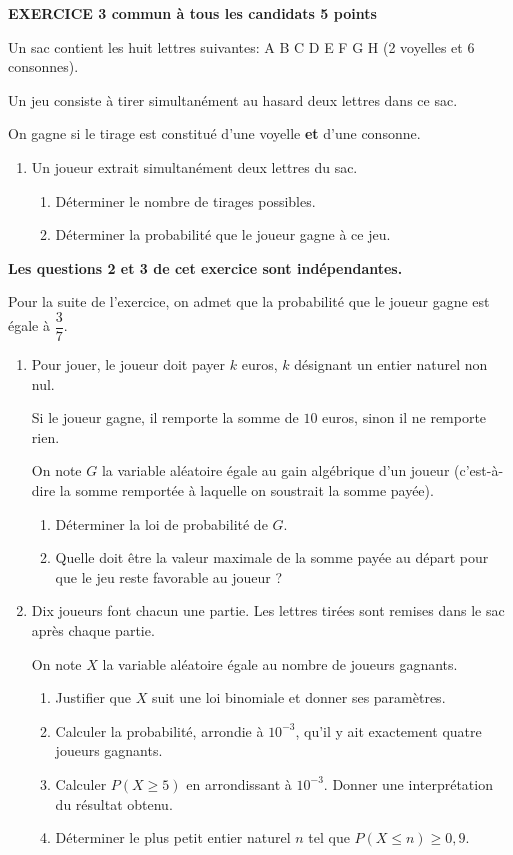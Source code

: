 \textbf{EXERCICE 3 commun à tous les candidats \hfill 5 points}

\medskip

Un sac contient les huit lettres suivantes: A B C D E F G H (2 voyelles et 6 consonnes).

Un jeu consiste à tirer simultanément au hasard deux lettres dans ce sac. 

On gagne si le tirage est constitué d'une voyelle \textbf{et} d'une consonne.

\medskip

\begin{enumerate}
\item Un joueur extrait simultanément deux lettres du sac.
	\begin{enumerate}
		\item Déterminer le nombre de tirages possibles.
		\item Déterminer la probabilité que le joueur gagne à ce jeu.
	\end{enumerate}
\end{enumerate}

\medskip
	
\textbf{Les questions 2 et 3 de cet exercice sont indépendantes.}

\medskip

Pour la suite de l'exercice, on admet que la probabilité que le joueur gagne est égale à $\dfrac{3}{7}$.

\begin{enumerate}[resume]
\item Pour jouer, le joueur doit payer $k$ euros, $k$ désignant un entier naturel non nul. 

Si le joueur gagne, il remporte la somme de $10$ euros, sinon il ne remporte rien.

On note $G$ la variable aléatoire égale au gain algébrique d'un joueur (c'est-à-dire la somme remportée à laquelle on soustrait la somme payée).
	\begin{enumerate}
		\item Déterminer la loi de probabilité de $G$.
		\item Quelle doit être la valeur maximale de la somme payée au départ pour que le jeu reste
favorable au joueur ?	
	\end{enumerate}
\item Dix joueurs font chacun une partie. Les lettres tirées sont remises dans le sac après chaque partie.

On note $X$ la variable aléatoire égale au nombre de joueurs gagnants.
	\begin{enumerate}
		\item Justifier que $X$ suit une loi binomiale et donner ses paramètres.
		\item Calculer la probabilité, arrondie à $10^{-3}$, qu'il y ait exactement quatre joueurs gagnants. 
		\item Calculer $P(X \geqslant 5)$ en arrondissant à $10^{-3}$. Donner une interprétation du résultat obtenu. 
		\item Déterminer le plus petit entier naturel $n$ tel que $P(X \leqslant n) \geqslant 0,9$.
	\end{enumerate}
\end{enumerate}

\bigskip


